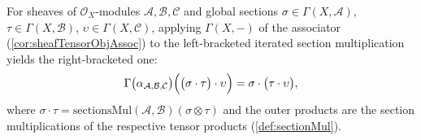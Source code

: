 \begin{lemma}
  \label{lem:sectionMul_assoc_core}
  For sheaves of \(\mathcal{O}_X\)-modules \(\mathcal{A}, \mathcal{B},
  \mathcal{C}\) and global sections \(\sigma \in \Gamma(X,\mathcal{A})\),
  \(\tau \in \Gamma(X,\mathcal{B})\), \(\upsilon \in \Gamma(X,\mathcal{C})\),
  applying \(\Gamma(X,-)\) of the associator (\cref{cor:sheafTensorObjAssoc}) to
  the left-bracketed iterated section multiplication yields the right-bracketed
  one:
  \[
    \Gamma\bigl(\alpha_{\mathcal{A},\mathcal{B},\mathcal{C}}\bigr)
      \Bigl( \bigl(\sigma \cdot \tau\bigr) \cdot \upsilon \Bigr)
      = \sigma \cdot \bigl(\tau \cdot \upsilon\bigr),
  \]
  where \(\sigma \cdot \tau = \mathrm{sectionsMul}(\mathcal{A},\mathcal{B})
  (\sigma \otimes \tau)\) and the outer products are the section multiplications
  of the respective tensor products (\cref{def:sectionMul}).
\end{lemma}

